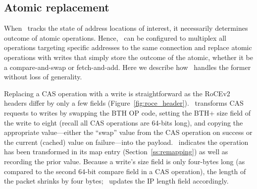 



\subsection{Atomic replacement}
\label{ss:rewrite}

When \sword\ tracks the state of address locations of interest, it
necessarily determines outcome of atomic operations.  Hence,
\sword\ can be configured to multiplex all operations targeting
specific addresses to the same connection and replace atomic
operations with writes that simply store the outcome of the atomic,
whether it be a compare-and-swap or fetch-and-add.  Here we describe
how \sword\ handles the former without loss of generality.

Replacing a CAS operation with a write is straightforward as the
RoCEv2 headers differ by only a few fields
(Figure~\ref{fig:roce_header}).  \sword\ transforms CAS requests to
writes by swapping the BTH OP code, setting the BTH+ size field of the
write to eight (recall all CAS operations are 64-bits long), and
copying the appropriate value---either the ``swap'' value from the CAS
operation on success or the current (cached) value on failure---into
the payload.  \sword\ indicates the operation has been transformed in
its map entry (Section~\ref{ss:remapping}) as well as recording the prior value.
Because a write's size field is only four-bytes long (as compared to
the second 64-bit compare field in a CAS operation), the length of the
packet shrinks by four bytes; \sword\ updates the IP length field
accordingly.


